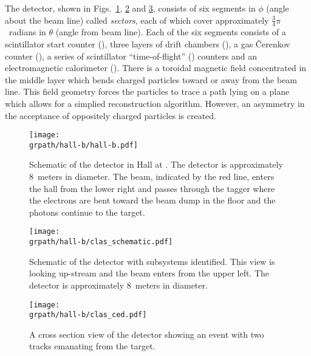 The  detector, shown in Figs.~\ref{fig:hall-b}, \ref{fig:clas} and \ref{fig:clas.ced}, consists of six segments in $\phi$ (angle about the beam line) called \emph{sectors}, each of which cover approximately $\frac{3}{4}\pi$~radians in $\theta$ (angle from beam line). Each of the six segments consists of a scintillator start counter (), three layers of drift chambers (), a gas \v{C}erenkov counter (), a series of scintillator ``time-of-flight'' () counters and an electromagnetic calorimeter (). There is a toroidal magnetic field concentrated in the middle  layer which bends charged particles toward or away from the beam line. This field geometry forces the particles to trace a path lying on a plane which allows for a simplied reconstruction algorithm. However, an asymmetry in the acceptance of oppositely charged particles is created.

\begin{figure}\begin{center}
\texttt{[image: \\grpath/hall-b/hall-b.pdf]}
\caption[Hall ]{\label{fig:hall-b}{}Schematic of the  detector\cite{clas} in Hall  at . The detector is approximately 8~meters in diameter. The beam, indicated by the red line, enters the hall from the lower right and passes through the tagger where the electrons are bent toward the beam dump in the floor and the photons continue to the target.}
\end{center}\end{figure}

\begin{figure}\begin{center}
\texttt{[image: \\grpath/hall-b/clas\_schematic.pdf]}
\caption[ Detector]{\label{fig:clas}{}Schematic of the  detector\cite{clas} with subsystems identified. This view is looking up-stream and the beam enters from the upper left. The detector is approximately 8~meters in diameter.}
\end{center}\end{figure}

\begin{figure}\begin{center}
\texttt{[image: \\grpath/hall-b/clas\_ced.pdf]}
\caption[ Detector Diagram]{\label{fig:clas.ced}A cross section view of the  detector showing an event with two tracks emanating from the target.}
\end{center}\end{figure}







%





